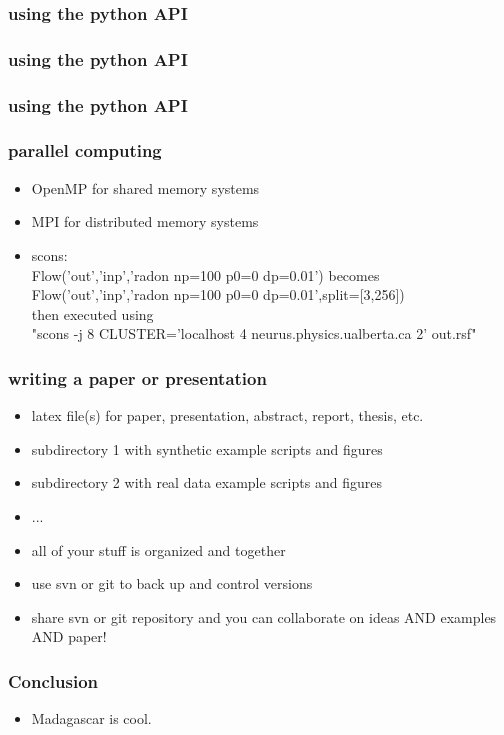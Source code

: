 
\begin{frame} \frametitle{using the python API}
\end{frame}

\begin{frame} \frametitle{using the python API}
\end{frame}

\begin{frame} \frametitle{using the python API}
\end{frame}

\begin{frame} \frametitle{parallel computing}
    \begin{itemize}
        \item OpenMP for shared memory systems 
        \item MPI for distributed memory systems
        \item scons: \\Flow('out','inp','radon np=100 p0=0 dp=0.01') becomes \\Flow('out','inp','radon np=100 p0=0 dp=0.01',split=[3,256]) \\then executed using \\"scons -j 8 CLUSTER='localhost 4 neurus.physics.ualberta.ca 2' out.rsf"
    \end{itemize}

\end{frame}

\begin{frame} \frametitle{writing a paper or presentation}
    \begin{itemize}
        \item latex file(s) for paper, presentation, abstract, report, thesis, etc.
        \item subdirectory 1 with synthetic example scripts and figures
        \item subdirectory 2 with real data example scripts and figures
        \item ...
    \end{itemize}
    \pause
    \begin{itemize}
        \item all of your stuff is organized and together
            \pause
        \item use svn or git to back up and control versions
            \pause
        \item share svn or git repository and you can collaborate on ideas AND examples AND paper! 
    \end{itemize} 
\end{frame}

\begin{frame} \frametitle{Conclusion}
    \begin{itemize}
        \item Madagascar is cool.
    \end{itemize}
\end{frame}


